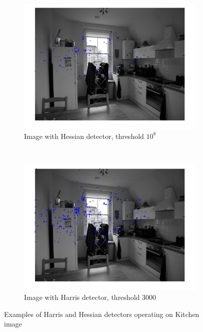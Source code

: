 \documentclass[a4paper, 10pt, conference]{ieeeconf}
\begin{document}
\begin{figure}[!ht]
  \captionsetup[subfigure]{position=b}
  \centering
    \begin{subfigure}{0.45\linewidth}
      \includegraphics[width=\textwidth]{pic/hessian1e8}
      \caption{Image with Hessian detector, threshold $10^8$}
      \label{fig:hessian1e8}
    \end{subfigure}
    ~
    \begin{subfigure}{0.45\linewidth}
      \includegraphics[width=\textwidth]{pic/harris3000}
      \caption{Image with Harris detector, threshold 3000}
      \label{fig:harris3000}
    \end{subfigure}

	\caption{Examples of Harris and Hessian detectors operating on Kitchen image}
  \label{fig:detectors}
\end{figure}
\end{document}
